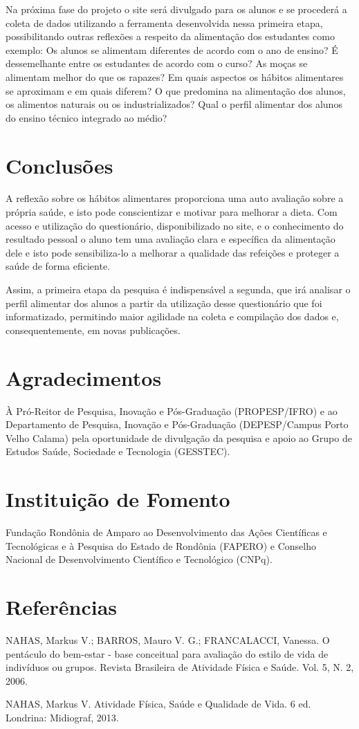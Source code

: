 \documentclass[article,12pt,onesidea,4paper,english,brazil]{abntex2}
\begin{document}
Na próxima fase do projeto o site será divulgado para os alunos e se procederá a coleta de dados utilizando a ferramenta desenvolvida nessa primeira etapa, possibilitando outras reflexões a respeito da alimentação dos estudantes como exemplo: Os alunos se alimentam diferentes de acordo com o ano de ensino? É dessemelhante entre os estudantes de acordo com o curso? As moças se alimentam melhor do que os rapazes? Em quais aspectos os hábitos alimentares se aproximam e em quais diferem? O que predomina na alimentação dos alunos, os alimentos naturais ou os industrializados? Qual o perfil alimentar dos alunos do ensino técnico integrado ao médio?
	
	\section*{Conclusões}
	
A reflexão sobre os hábitos alimentares proporciona uma auto avaliação sobre a própria saúde, e isto pode conscientizar e motivar para melhorar a dieta. Com acesso e utilização do questionário, disponibilizado no site, e o conhecimento do resultado pessoal o aluno tem uma avaliação clara e específica da alimentação dele e isto pode sensibiliza-lo a melhorar a qualidade das refeições e proteger a saúde de forma eficiente.	

Assim, a primeira etapa da pesquisa é indispensável a segunda, que irá analisar o perfil alimentar dos alunos a partir da utilização desse questionário que foi informatizado, permitindo maior agilidade na coleta e compilação dos dados e, consequentemente, em novas publicações.

	\section*{Agradecimentos}
	
	À Pró-Reitor de Pesquisa, Inovação e Pós-Graduação (PROPESP/IFRO) e ao Departamento de Pesquisa, Inovação e Pós-Graduação (DEPESP/Campus Porto Velho Calama) pela oportunidade de divulgação da pesquisa e apoio ao Grupo de Estudos Saúde, Sociedade e Tecnologia (GESSTEC).
	
	\section*{Instituição de Fomento}
	
Fundação Rondônia de Amparo ao Desenvolvimento das Ações Científicas e Tecnológicas e à Pesquisa do Estado de Rondônia (FAPERO) e Conselho Nacional de Desenvolvimento Científico e Tecnológico (CNPq).
	
	\section*{Referências}
	
	\noindent NAHAS, Markus V.; BARROS, Mauro V. G.; FRANCALACCI, Vanessa. O pentáculo do bem-estar - base conceitual para avaliação do estilo de vida de indivíduos ou grupos. Revista Brasileira de Atividade Física e Saúde. Vol. 5, N. 2, 2006.
	
	\noindent NAHAS, Markus V. Atividade Física, Saúde e Qualidade de Vida. 6 ed. Londrina: Midiograf, 2013.
	
\end{document}
